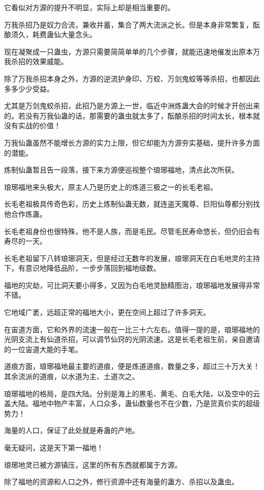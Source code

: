 \begin{this_body}
它看似对方源的提升不明显，实际上却是相当重要的。

万我杀招乃是奴力合流，兼收并蓄，集合了两大流派之长。但是本身非常繁复，酝酿须久，耗费蛊仙大量念头。

现在凝聚成一只蛊虫，方源只需要简简单单的几个步骤，就能迅速地催发出原本万我杀招的效果威能。

除了万我杀招本身之外，方源的逆流护身印、万蛟、万剑鬼蛟等等杀招，也都因此多多少少受益。

尤其是万剑鬼蛟杀招，此招乃是方源上一世，临近中洲炼蛊大会的时候才开创出来的。若没有万我仙蛊的话，那需要的蛊虫就太多了，酝酿杀招的时间太长，根本就没有实战的价值！

万我仙蛊虽然不能增长方源的实力上限，但它却能为方源夯实基础，提升许多方面的潜能。

炼制仙蛊暂且告一段落，接下来方源便巡视整个琅琊福地，清点此次所获。

琅琊福地来头极大，原主人乃是历史上的炼道三极之一的长毛老祖。

长毛老祖极具传奇色彩，历史上炼制仙蛊无数，就连盗天魔尊、巨阳仙尊都分别找他合作炼蛊。

长毛老祖身份也很特殊，他不是人族，而是毛民。尽管毛民寿命悠长，但仍旧会有寿尽的一天。

长毛老祖留下八转琅琊洞天，但是经过无数年的发展，琅琊洞天在白毛地灵的主持下，有意识地降低品阶，一步步落回到福地级数。

福地的灾劫，可比洞天要小得多，又因为白毛地灵励精图治，琅琊福地发展得非常不错。

它地域广袤，远超正常的福地大小，更在空间上超过了许多洞天。

在宙道方面，它和外界的流速一般在一比三十六左右。值得一提的是，琅琊福地的光阴支流上有仙道杀招，可以调节仙窍的光阴流速。这是长毛老祖生前，亲自邀请的一位宙道大能的手笔。

道痕方面，琅琊福地最主要的道痕，便是炼道道痕，数量之多，超过三十万大关！其余流派的道痕，以水道为主、土道次之。

琅琊福地的格局，是四大陆。分别是海上的黑毛、黄毛、白毛大陆，以及空中的云盖大陆。福地中物产丰富，人口众多，蛊仙数量也不在少数，乃是货真价实的超级势力！

海量的人口，保证了此处就是寿蛊的产地。

毫无疑问，这是天下第一福地！

琅琊地灵已被方源镇压，这里的所有东西就都属于方源。

除了福地的资源和人口之外，修行资源中还有海量的蛊方、杀招以及蛊虫。


\end{this_body}
